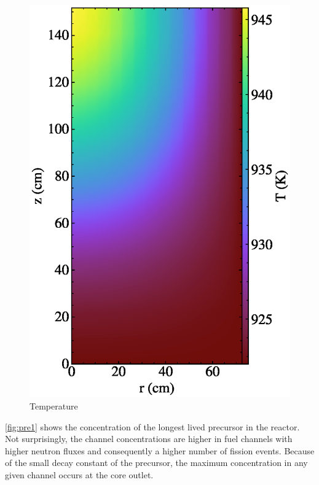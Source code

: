 \documentclass{article}
\begin{document}
\begin{figure}
  \centering
  \includegraphics{auto_diff_rho_temp.eps}
  \caption{Temperature}
  \label{fig:temp}
\end{figure}

\cref{fig:pre1} shows the concentration of the longest lived precursor in the
reactor. Not surprisingly, the channel concentrations are higher in fuel channels
with higher neutron fluxes and consequently a higher number of fission
events. Because of the small decay constant of the precursor, the maximum
concentration in any given channel occurs at the core outlet.
\end{document}
